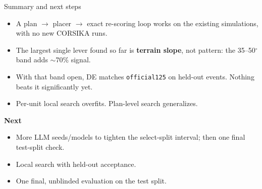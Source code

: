 \documentclass[aspectratio=169,11pt]{beamer}
\begin{document}
\begin{frame}{Summary and next steps}
  \small
  \begin{itemize}
    \item A plan $\rightarrow$ placer $\rightarrow$ exact re-scoring loop works on the existing simulations, with no new CORSIKA runs.
    \item The largest single lever found so far is \textbf{terrain slope}, not pattern: the 35--50$^\circ$ band adds $\sim$70\% signal.
    \item With that band open, DE matches \texttt{official125} on held-out events. Nothing beats it significantly yet.
    \item Per-unit local search overfits. Plan-level search generalizes.
  \end{itemize}
  \vspace{0.3em}
  \textbf{Next}
  \begin{itemize}
    \item More LLM seeds/models to tighten the select-split interval; then one final test-split check.
    \item Local search with held-out acceptance.
    \item One final, unblinded evaluation on the test split.
  \end{itemize}
\end{frame}
\end{document}
